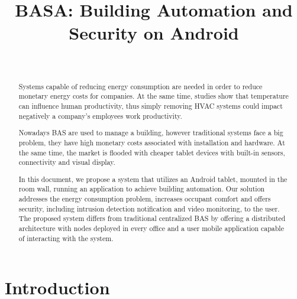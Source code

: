 \documentclass[conference]{IEEEtran}
\begin{document}
\title{\LARGE BASA: Building Automation and Security on Android
}

\author{
  \\
}


\maketitle

\begin{abstract}
Systems capable of reducing energy consumption are needed in order to reduce monetary energy costs for companies. At the same time, studies show that temperature can influence human productivity, thus simply removing \ac{HVAC} systems could impact negatively a company's employees work productivity.

Nowadays \ac{BAS} are used to manage a building, however traditional systems face a big problem, they have high monetary costs associated with installation and hardware. At the same time, the market is flooded with cheaper tablet devices with built-in sensors, connectivity and visual display.

In this document, we propose a system that utilizes an Android tablet, mounted in the room wall, running an application to achieve building automation. Our solution addresses the energy consumption problem, increases occupant comfort and offers security, including intrusion detection notification and video monitoring, to the user. The proposed system differs from traditional centralized \ac{BAS} by offering a distributed architecture with nodes deployed in every office and a user mobile application capable of interacting with the system.

\end{abstract}

\IEEEpeerreviewmaketitle

\section{Introduction}
\label{introduction}
\end{document}
